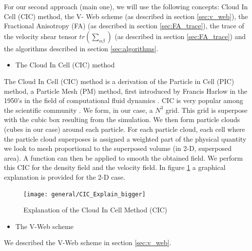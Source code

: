 \documentclass[12pt]{article}
\begin{document}
\begin{par}
For our second approach (main one), we will use the
 following concepts: Cloud In Cell (CIC) method, the V-
 Web scheme (as described in section \ref{sec:v_web}),
  the Fractional Anisotropy (FA) (as described in
   section \ref{sec:FA_trace}), the trace of the
    velocity shear tensor $tr\left(\sum_{\alpha
     \beta}\right)$ (as described in section
      \ref{sec:FA_trace}) and the algorithms described
       in section \ref{sec:algorithms}.\\
\end{par}


\begin{itemize}
\item The Cloud In Cell (CIC) method
\end{itemize}
\begin{par}
The Cloud In Cell (CIC) method is a derivation of the
 Particle in Cell (PIC) method, a Particle Mesh (PM)
  method, first introduced by Francis Harlow in the
   1950's in the field of computational fluid dynamics
    \cite{harlow1964particle}. CIC is very popular
     among the scientific community
      \cite{grigoryev_numerical_2002}. We form, in our
       case, a $N^3$ grid. This grid is superpose with
        the cubic
      box resulting from the simulation. We then form
       particle clouds (cubes in our case) around each
        particle. For each particle cloud, each cell
         where the particle cloud superposes is
          assigned a weighted part of the physical
           quantity we look to mesh proportional to the
            superposed volume (in 2-D, superposed
             area). A function can then be applied to
              smooth the obtained field. We perform
               this CIC
            for the density field and the velocity
             field. In figure \ref{fg:cic_explain} a
              graphical explanation is provided for the
               2-D case.  \\
\end{par}

\begin{figure}[ht]
\begin{center}
\texttt{[image: general/CIC\_Explain\_bigger]} %
\caption{Explanation of the Cloud In Cell Method (CIC)}
\label{fg:cic_explain}
\end{center}
\end{figure}
\FloatBarrier

\begin{itemize}
\item The V-Web scheme
\end{itemize}
\begin{par}
We described the V-Web scheme in section \ref{sec:v_web}.\\ %
\end{par}
\end{document}
